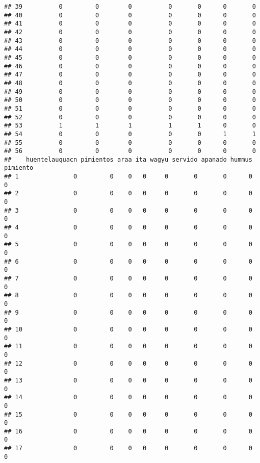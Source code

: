 \documentclass[
]{article}
\begin{document}
\begin{verbatim}
## 39          0         0        0          0       0      0       0
## 40          0         0        0          0       0      0       0
## 41          0         0        0          0       0      0       0
## 42          0         0        0          0       0      0       0
## 43          0         0        0          0       0      0       0
## 44          0         0        0          0       0      0       0
## 45          0         0        0          0       0      0       0
## 46          0         0        0          0       0      0       0
## 47          0         0        0          0       0      0       0
## 48          0         0        0          0       0      0       0
## 49          0         0        0          0       0      0       0
## 50          0         0        0          0       0      0       0
## 51          0         0        0          0       0      0       0
## 52          0         0        0          0       0      0       0
## 53          1         1        1          1       1      0       0
## 54          0         0        0          0       0      1       1
## 55          0         0        0          0       0      0       0
## 56          0         0        0          0       0      0       0
##    huentelauquacn pimientos araa ita wagyu servido apanado hummus pimiento
## 1               0         0    0   0     0       0       0      0        0
## 2               0         0    0   0     0       0       0      0        0
## 3               0         0    0   0     0       0       0      0        0
## 4               0         0    0   0     0       0       0      0        0
## 5               0         0    0   0     0       0       0      0        0
## 6               0         0    0   0     0       0       0      0        0
## 7               0         0    0   0     0       0       0      0        0
## 8               0         0    0   0     0       0       0      0        0
## 9               0         0    0   0     0       0       0      0        0
## 10              0         0    0   0     0       0       0      0        0
## 11              0         0    0   0     0       0       0      0        0
## 12              0         0    0   0     0       0       0      0        0
## 13              0         0    0   0     0       0       0      0        0
## 14              0         0    0   0     0       0       0      0        0
## 15              0         0    0   0     0       0       0      0        0
## 16              0         0    0   0     0       0       0      0        0
## 17              0         0    0   0     0       0       0      0        0

\end{verbatim}
\end{document}
